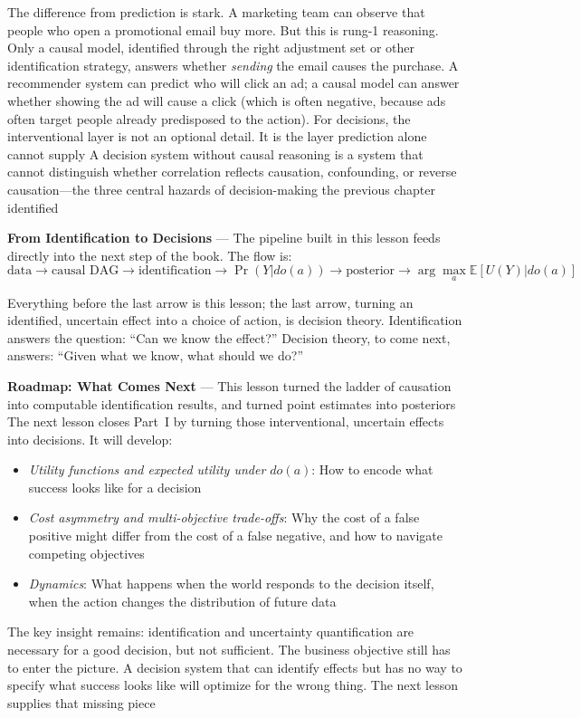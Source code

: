 The difference from prediction is stark. A marketing team can observe that
people who open a promotional email buy more. But this is rung-1 reasoning. Only
a causal model, identified through the right adjustment set or other identification
strategy, answers whether \emph{sending} the email causes the purchase. A
recommender system can predict who will click an ad; a causal model can answer whether
showing the ad will cause a click (which is often negative, because ads often target
people already predisposed to the action). For decisions, the interventional
layer is not an optional detail. It is the layer prediction alone cannot supply A
decision system without causal reasoning is a system that cannot distinguish whether
correlation reflects causation, confounding, or reverse causation—the three central
hazards of decision-making the previous chapter identified

\textbf{From Identification to Decisions} --- The pipeline built in this lesson feeds
directly into the next step of the book. The flow is:
\begin{equation}
  \text{data}\to \text{causal DAG}\to \text{identification}\to \Pr(Y|do(a)) \to \text{posterior}
  \to \arg\max_{a}\mathbb{E}[U(Y)|do(a)] \label{eq:causal-pipeline}
\end{equation}

Everything before the last arrow is this lesson; the last arrow, turning an
identified, uncertain effect into a choice of action, is decision theory. Identification
answers the question: ``Can we know the effect?'' Decision theory, to come next,
answers: ``Given what we know, what should we do?''

\textbf{Roadmap: What Comes Next} --- This lesson turned the ladder of causation
into computable identification results, and turned point estimates into posteriors
The next lesson closes Part~I by turning those interventional, uncertain effects
into decisions. It will develop:

\begin{itemize}
  \item \emph{Utility functions and expected utility under $do(a)$}: How to encode
    what success looks like for a decision

  \item \emph{Cost asymmetry and multi-objective trade-offs}: Why the cost of a false
    positive might differ from the cost of a false negative, and how to navigate
    competing objectives

  \item \emph{Dynamics}: What happens when the world responds to the decision itself,
    when the action changes the distribution of future data
\end{itemize}

The key insight remains: identification and uncertainty quantification are necessary
for a good decision, but not sufficient. The business objective still has to enter
the picture. A decision system that can identify effects but has no way to
specify what success looks like will optimize for the wrong thing. The next lesson
supplies that missing piece
